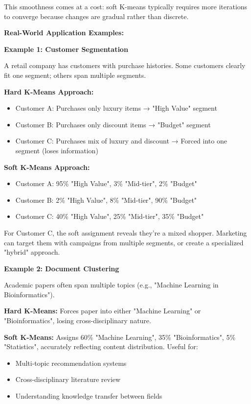 \documentclass[12pt]{article}
\begin{document}
\begin{explanation}
This smoothness comes at a cost: soft K-means typically requires more iterations to converge because changes are gradual rather than discrete.

\textbf{Real-World Application Examples:}

\textbf{Example 1: Customer Segmentation}

A retail company has customers with purchase histories. Some customers clearly fit one segment; others span multiple segments.

\textbf{Hard K-Means Approach:}
\begin{itemize}
    \item Customer A: Purchases only luxury items → "High Value" segment
    \item Customer B: Purchases only discount items → "Budget" segment
    \item Customer C: Purchases mix of luxury and discount → Forced into one segment (loses information)
\end{itemize}

\textbf{Soft K-Means Approach:}
\begin{itemize}
    \item Customer A: 95\% "High Value", 3\% "Mid-tier", 2\% "Budget"
    \item Customer B: 2\% "High Value", 8\% "Mid-tier", 90\% "Budget"
    \item Customer C: 40\% "High Value", 25\% "Mid-tier", 35\% "Budget"
\end{itemize}

For Customer C, the soft assignment reveals they're a mixed shopper. Marketing can target them with campaigns from multiple segments, or create a specialized "hybrid" approach.

\textbf{Example 2: Document Clustering}

Academic papers often span multiple topics (e.g., "Machine Learning in Bioinformatics").

\textbf{Hard K-Means:} Forces paper into either "Machine Learning" or "Bioinformatics", losing cross-disciplinary nature.

\textbf{Soft K-Means:} Assigns 60\% "Machine Learning", 35\% "Bioinformatics", 5\% "Statistics", accurately reflecting content distribution. Useful for:
\begin{itemize}
    \item Multi-topic recommendation systems
    \item Cross-disciplinary literature review
    \item Understanding knowledge transfer between fields
\end{itemize}


\end{explanation}
\end{document}

